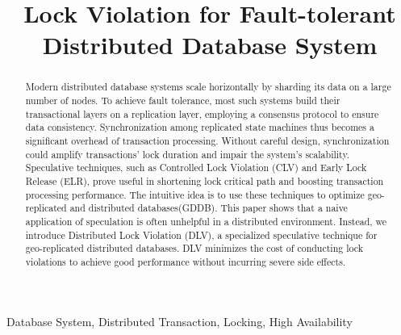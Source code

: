 \documentclass[conference]{IEEEtran}
\begin{document}
\title{Lock Violation for Fault-tolerant Distributed Database System}


\author{
\and
{}
\and
{}

}

\maketitle

\begin{abstract}
Modern distributed database systems scale horizontally by sharding its data on a large number of nodes.
To achieve fault tolerance, most such systems build their transactional layers on a replication layer,
employing a consensus protocol to ensure data consistency.
Synchronization among replicated state machines thus becomes a significant overhead of transaction processing.
Without careful design, synchronization could amplify transactions' lock duration and impair the system's scalability.
Speculative techniques, such as Controlled Lock Violation (CLV) and Early Lock Release (ELR), prove useful in shortening lock critical path and boosting transaction processing performance.
The intuitive idea is to use these techniques to optimize geo-replicated and distributed databases(GDDB).
This paper shows that a naive application of speculation is often unhelpful in a distributed environment.
Instead, we introduce Distributed Lock Violation (DLV), a specialized speculative technique for geo-replicated distributed databases.
DLV minimizes the cost of conducting lock violations to achieve good performance without incurring severe side effects.
\end{abstract}

\begin{IEEEkeywords}
Database System, Distributed Transaction, Locking, High Availability
\end{IEEEkeywords}
\end{document}
